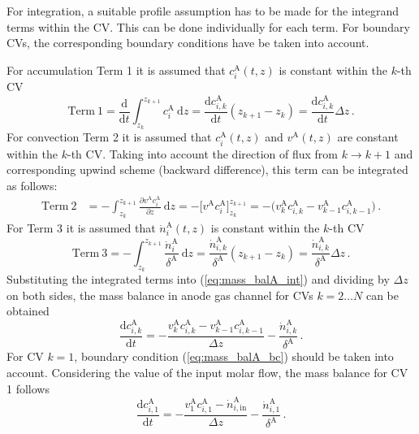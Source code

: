 \documentclass[pdftex,a4paper, 12pt]{article}
\begin{document}
%
%
For integration, a suitable profile assumption has to be made for the integrand terms within the CV. This can be done individually for each term. For boundary CVs, the corresponding boundary conditions have be taken into account.
%
\par
%
For accumulation Term 1 it is assumed that $c_{i}^{\mathrm{A}}(t,z)$ is constant within the $k$-th CV
%
\begin{equation}
	\mathrm{Term~1} = \frac{\mathrm{d}}{\mathrm{d} t} \int_{z_k}^{z_{k+1}}  c_{i}^{\mathrm{A}} ~\mathrm{d}z = \frac{\mathrm{d} c_{i,k}^{\mathrm{A}} }{\mathrm{d} t} (z_{k+1} - z_{k}) = \frac{\mathrm{d} c_{i,k}^{\mathrm{A}} }{\mathrm{d} t} \Delta z  \, .
\end{equation}
%
For convection Term 2 it is assumed that $c_{i}^{\mathrm{A}}(t,z)$ and $v^{\mathrm{A}}(t,z)$ are constant within the $k$-th CV. Taking into account the direction of flux from $k \to k+1$ and corresponding upwind scheme (backward difference), this term can be integrated as follows:
%
\begin{align}
	 \mathrm{Term~2} &=- \int_{z_k}^{z_{k+1}} \frac{\partial v^{\mathrm{A}} c_{i}^{\mathrm{A}}}{\partial z} ~\mathrm{d}z = - \big[ v^{\mathrm{A}} c_{i}^{\mathrm{A}} \big]_{z_k}^{z_{k+1}} = - \big( v_{k}^{\mathrm{A}} c_{i,k}^{\mathrm{A}} - v_{k-1}^{\mathrm{A}} c_{i,k-1}^{\mathrm{A}} \big) \, .
\end{align}
%
For Term 3 it is assumed that $\dot{n}_{i}^{\mathrm{A}}(t,z)$ is constant within the $k$-th CV
%
\begin{equation}
	\mathrm{Term~3} =- \int_{z_k}^{z_{k+1}} \frac{\dot{n}_{i}^{\mathrm{A}}}{\delta^{\mathrm{A}}} ~\mathrm{d}z = \frac{\dot{n}_{i,k}^{\mathrm{A}}}{\delta^{\mathrm{A}}} (z_{k+1} - z_{k}) =  \frac{\dot{n}_{i,k}^{\mathrm{A}}}{\delta^{\mathrm{A}}} \Delta z \, .
\end{equation}
%
Substituting the integrated terms into (\ref{eq:mass_balA_int}) and dividing by $\Delta z$ on both sides, the mass balance in anode gas channel for CVs $k=2 \dots N$ can be obtained
%
\begin{equation}
	\frac{\mathrm{d} c_{i,k}^{\mathrm{A}}}{\mathrm{d} t} =-\frac{v_{k}^{\mathrm{A}} c_{i,k}^{\mathrm{A}} - v_{k-1}^{\mathrm{A}} c_{i,k-1}^{\mathrm{A}}}{\Delta z} - \frac{\dot{n}_{i,k}^{\mathrm{A}}}{\delta^{\mathrm{A}}} \, .
	\label{eq:mass_balA_disc}
\end{equation}
%
%
For CV $k = 1$, boundary condition (\ref{eq:mass_balA_bc}) should be taken into account. Considering the value of the input molar flow, the mass balance for CV 1 follows
%
\begin{equation}
	\frac{\mathrm{d} c_{i,1}^{\mathrm{A}}}{\mathrm{d} t} =-\frac{v_{1}^{\mathrm{A}} c_{i,1}^{\mathrm{A}} - \dot{n}_{i,\mathrm{in}}^{\mathrm{A}} }{\Delta z} - \frac{\dot{n}_{i,1}^{\mathrm{A}}}{\delta^{\mathrm{A}}} \, .
	\label{eq:mass_balA_disc1}
\end{equation}
%
%
\end{document}
